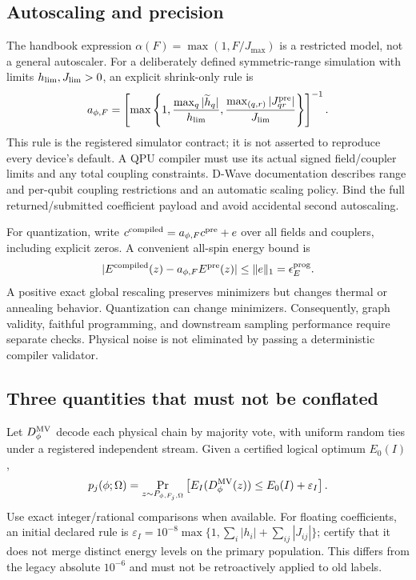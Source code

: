 \documentclass[11pt,a4paper]{article}
\theoremstyle{definition}\newtheorem{definition}[proposition]{Definition}
\begin{document}
\subsection{Autoscaling and precision}
The handbook expression $\alpha(F)=\max(1,F/J_{\max})$ is a restricted model, not a general autoscaler. For a deliberately defined symmetric-range simulation with limits $h_{\rm lim},J_{\rm lim}>0$, an explicit shrink-only rule is
\begin{equation}
a_{\phi,F}=\left[\max\left\{1,
\frac{\max_q|\widetilde h_q|}{h_{\rm lim}},
\frac{\max_{(q,r)}|J^{\rm pre}_{qr}|}{J_{\rm lim}}\right\}\right]^{-1}.
\label{eq:scale}
\end{equation}
This rule is the registered simulator contract; it is not asserted to reproduce every device's default. A QPU compiler must use its actual signed field/coupler limits and any total coupling constraints. D-Wave documentation describes range and per-qubit coupling restrictions and an automatic scaling policy\cite{dwave2026}. Bind the full returned/submitted coefficient payload and avoid accidental second autoscaling.

For quantization, write $c^{\rm compiled}=a_{\phi,F}c^{\rm pre}+e$ over all fields and couplers, including explicit zeros. A convenient all-spin energy bound is
\begin{equation}
|E^{\rm compiled}(z)-a_{\phi,F}E^{\rm pre}(z)|\le \|e\|_1=\epsilon_E^{\rm prog}.
\end{equation}
A positive exact global rescaling preserves minimizers but changes thermal or annealing behavior. Quantization can change minimizers. Consequently, graph validity, faithful programming, and downstream sampling performance require separate checks. Physical noise is not eliminated by passing a deterministic compiler validator.

\subsection{Three quantities that must not be conflated}
Let $D_\phi^{\rm MV}$ decode each physical chain by majority vote, with uniform random ties under a registered independent stream. Given a certified logical optimum $E_0(I)$,
\begin{equation}
p_j(\phi;\Omega)=\Pr_{z\sim P_{\phi,F_j,\Omega}}
\left[E_I(D_\phi^{\rm MV}(z))\le E_0(I)+\varepsilon_I\right].
\label{eq:pj}
\end{equation}
Use exact integer/rational comparisons when available. For floating coefficients, an initial declared rule is $\varepsilon_I=10^{-8}\max\{1,\sum_i|h_i|+\sum_{ij}|J_{ij}|\}$; certify that it does not merge distinct energy levels on the primary population. This differs from the legacy absolute $10^{-6}$ and must not be retroactively applied to old labels.
\end{document}
